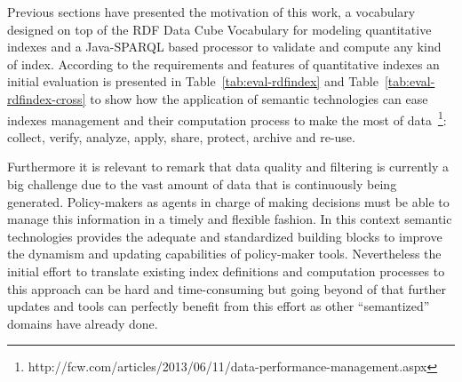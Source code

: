 Previous sections have presented the motivation of this work, a vocabulary designed on top of the 
RDF Data Cube Vocabulary for modeling quantitative indexes and a Java-SPARQL based processor 
to validate and compute any kind of index. According to the requirements and features 
of quantitative indexes an initial evaluation is presented in Table~\ref{tab:eval-rdfindex} and Table~\ref{tab:eval-rdfindex-cross} 
to show how the application of semantic technologies can ease indexes management and their computation process 
to make the most of data~\footnote{http://fcw.com/articles/2013/06/11/data-performance-management.aspx}: 
collect, verify, analyze, apply, share, protect, archive and re-use.

Furthermore it is relevant to remark that data quality and filtering is currently a big challenge 
due to the vast amount of data that is continuously being generated. Policy-makers as agents in charge 
of making decisions must be able to manage this information in a timely and flexible fashion. In this context semantic technologies provides the adequate and standardized building blocks to improve the dynamism and updating capabilities of policy-maker tools. Nevertheless 
the initial effort to translate existing index definitions and computation processes to this approach can 
be hard and time-consuming but going beyond of that further updates and tools can perfectly benefit from this effort as 
other ``semantized'' domains have already done. 

